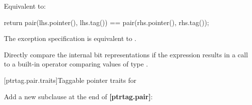 \documentclass{wg21}
\newcommand{\editinstr}[1]{\textcolor{noteclr}{#1}}
\begin{document}
\begin{itemdescr}
\pnum
\effects
Equivalent to:
\begin{codeblock}
return pair(lhs.pointer(), lhs.tag()) == pair(rhs.pointer(), rhs.tag());
\end{codeblock}

\begin{addedblock}
\pnum
\remarks
The exception specification is equivalent to
.
\end{addedblock}

\pnum
\recommended
Directly compare the internal bit representations
if the expression 
results in a call to a built-in operator \tcode{==}
comparing values of type .
\end{itemdescr}

[ptrtag.pair.traits]{Taggable pointer traits for }

\editinstr{Add a new subclause at the end of \textbf{[ptrtag.pair]}:}
\end{document}
